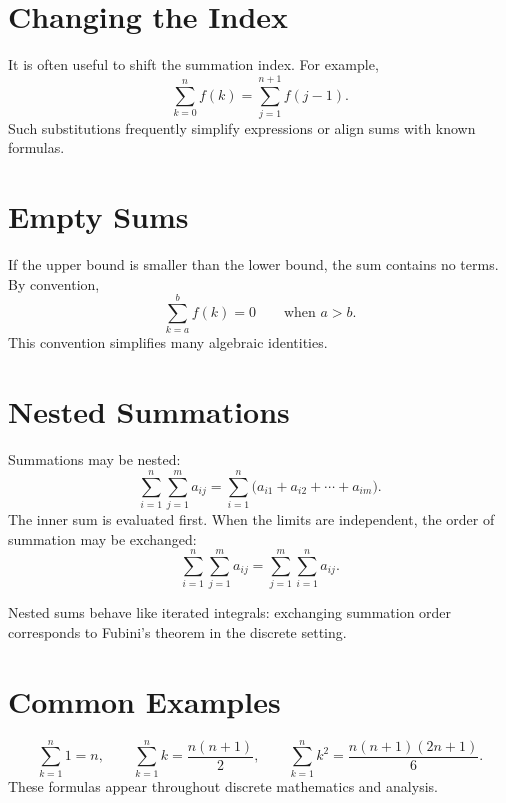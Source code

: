 \section*{Changing the Index}

It is often useful to shift the summation index. For example,
\[
\sum_{k=0}^{n} f(k) = \sum_{j=1}^{n+1} f(j-1).
\]
Such substitutions frequently simplify expressions or align sums
with known formulas.

\section*{Empty Sums}

If the upper bound is smaller than the lower bound, the sum contains
no terms. By convention,
\[
\sum_{k=a}^{b} f(k) = 0 \qquad \text{when } a > b.
\]
This convention simplifies many algebraic identities.

\section*{Nested Summations}

Summations may be nested:
\[
\sum_{i=1}^{n} \sum_{j=1}^{m} a_{ij}
= \sum_{i=1}^{n}\bigl(a_{i1} + a_{i2} + \cdots + a_{im}\bigr).
\]
The inner sum is evaluated first. When the limits are independent,
the order of summation may be exchanged:
\[
\sum_{i=1}^{n}\sum_{j=1}^{m} a_{ij}
=
\sum_{j=1}^{m}\sum_{i=1}^{n} a_{ij}.
\]

\begin{remark*}
Nested sums behave like iterated integrals: exchanging summation order
corresponds to Fubini's theorem in the discrete setting.
\end{remark*}

\section*{Common Examples}

\[
\sum_{k=1}^{n} 1 = n, \qquad
\sum_{k=1}^{n} k = \frac{n(n+1)}{2}, \qquad
\sum_{k=1}^{n} k^2 = \frac{n(n+1)(2n+1)}{6}.
\]
These formulas appear throughout discrete mathematics and analysis.
